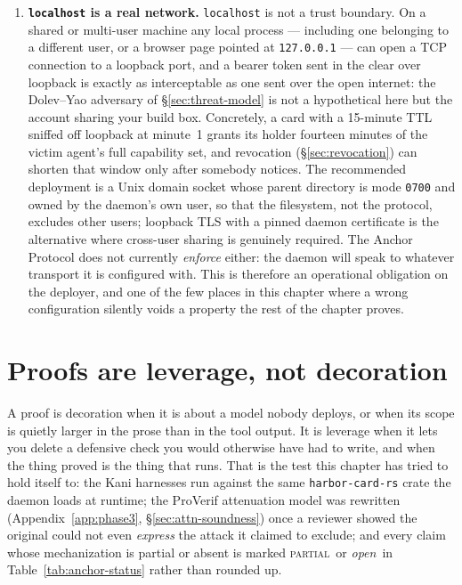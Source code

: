 \documentclass[11pt,a4paper]{article}
\newcommand{\Partial}{{\textcolor{hhink}{\textsc{partial}}}}
\newcommand{\Open}{{\textcolor{hhgray}{\textit{open}}}}
\theoremstyle{definition}
\begin{document}
\begin{enumerate}
  \item \textbf{\texttt{localhost} is a real network.} \texttt{localhost} is not a trust boundary. On a shared or multi-user machine any local process --- including one belonging to a different user, or a browser page pointed at \texttt{127.0.0.1} --- can open a TCP connection to a loopback port, and a bearer token sent in the clear over loopback is exactly as interceptable as one sent over the open internet: the Dolev--Yao adversary of \S\ref{sec:threat-model} is not a hypothetical here but the account sharing your build box. Concretely, a card with a 15-minute TTL sniffed off loopback at minute~1 grants its holder fourteen minutes of the victim agent's full capability set, and revocation (\S\ref{sec:revocation}) can shorten that window only after somebody notices. The recommended deployment is a Unix domain socket whose parent directory is mode \texttt{0700} and owned by the daemon's own user, so that the filesystem, not the protocol, excludes other users; loopback TLS with a pinned daemon certificate is the alternative where cross-user sharing is genuinely required. The Anchor Protocol does not currently \emph{enforce} either: the daemon will speak to whatever transport it is configured with. This is therefore an operational obligation on the deployer, and one of the few places in this chapter where a wrong configuration silently voids a property the rest of the chapter proves.
\end{enumerate}

\section{Proofs are leverage, not decoration}\label{sec:conclusion}

A proof is decoration when it is about a model nobody deploys, or when its scope is quietly larger in the prose than in the tool output. It is leverage when it lets you delete a defensive check you would otherwise have had to write, and when the thing proved is the thing that runs. That is the test this chapter has tried to hold itself to: the Kani harnesses run against the same \texttt{harbor-card-rs} crate the daemon loads at runtime; the ProVerif attenuation model was rewritten (Appendix~\ref{app:phase3}, \S\ref{sec:attn-soundness}) once a reviewer showed the original could not even \emph{express} the attack it claimed to exclude; and every claim whose mechanization is partial or absent is marked \Partial\ or \Open\ in Table~\ref{tab:anchor-status} rather than rounded up.
\end{document}
